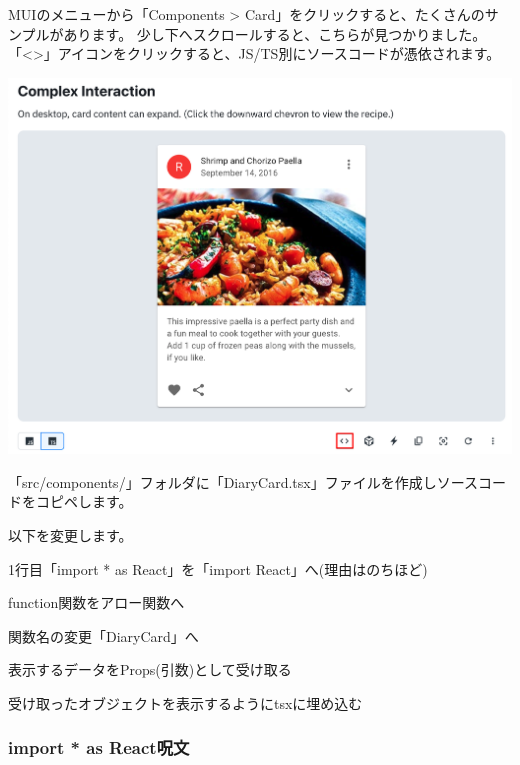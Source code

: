 MUIのメニューから「Components \textgreater{} Card」をクリックすると、たくさんのサンプルがあります。
少し下へスクロールすると、こちらが見つかりました。
「\textless{}\textgreater{}」アイコンをクリックすると、JS/TS別にソースコードが憑依されます。

\begin{reviewimage}%
\includegraphics[width=1.0\maxwidth]{./images/03-todo-with-react/mui009-card-ComplexInteraction.png}%
\label{image:03-todo-with-react:mui009-card-ComplexInteraction}
\end{reviewimage}

「src/components/」フォルダに「DiaryCard.tsx」ファイルを作成しソースコードをコピペします。

以下を変更します。

\begin{starteritemize}
\item 1行目「import * as React」を「import React」へ(理由はのちほど)
\item function関数をアロー関数へ
\item 関数名の変更「DiaryCard」へ
\item 表示するデータをProps(引数)として受け取る
\item 受け取ったオブジェクトを表示するようにtsxに埋め込む
\end{starteritemize}

\subsubsection*{import * as React呪文}
\keeplastskip{
  \label{sec:3-3-4-1}
  \label{sec-00332-1}
  \par\nobreak
}

